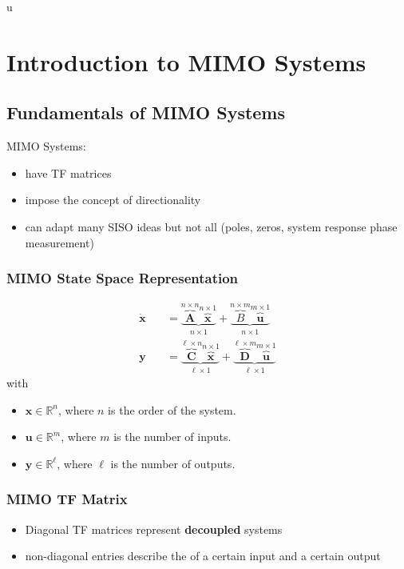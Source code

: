 u\section{Introduction to MIMO Systems}
\subsection{Fundamentals of MIMO Systems}


MIMO Systems:
\begin{itemize}
    \item have TF matrices
    \item impose the concept of directionality
    \item can adapt many SISO ideas but not all (poles, zeros, system response phase measurement)
\end{itemize}

\subsubsection{MIMO State Space Representation}
\begin{align*}
    \dot{\mathbf{x}} & =\underbrace{\overbrace{\mathbf{A}}^{n\times n}\overbrace{\mathbf{x}}^{n\times1}}_{n\times1}+\underbrace{\overbrace{B}^{n\times m}\overbrace{\mathbf{u}}^{m\times1}}_{n\times1}                      \\
    \mathbf{y}\quad  & =\underbrace{\overbrace{\mathbf{C}}^{\ell\times n}\overbrace{\mathbf{x}}^{n\times1}}_{\ell\times1}+\underbrace{\overbrace{\mathbf{D}}^{\ell\times m}\overbrace{\mathbf{u}}^{m\times1}}_{\ell\times1}
\end{align*}
with
\begin{itemize}
    \item $\mathbf{x}\in\mathbb{R}^n$, where $n$ is the order of the system.
    \item $\mathbf{u}\in\mathbb{R}^m$, where $m$ is the number of inputs.
    \item $\mathbf{y}\in\mathbb{R}^\ell$, where $\ell$ is the number of outputs.
\end{itemize}

\subsubsection{MIMO TF Matrix}

\begin{itemize}
    \item Diagonal TF matrices represent \textbf{decoupled} systems
    \item non-diagonal entries describe the of a certain input and a certain output
\end{itemize}

